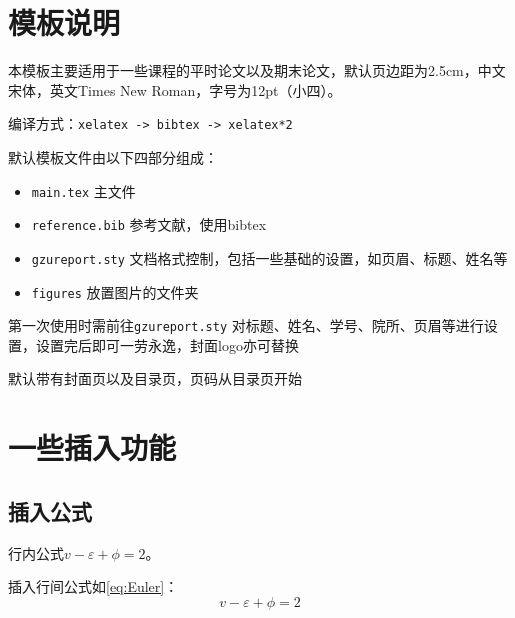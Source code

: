 \documentclass[12pt,hyperref,a4paper,UTF8]{ctexart}
\begin{document}
\cover

%
%

\thispagestyle{empty} %

\newpage
\tableofcontents

\newpage


\section{模板说明}
本模板主要适用于一些课程的平时论文以及期末论文，默认页边距为2.5cm，中文宋体，英文Times New Roman，字号为12pt（小四）。

编译方式：\verb|xelatex -> bibtex -> xelatex*2|


默认模板文件由以下四部分组成：
\begin{itemize}
    \item \texttt{main.tex} 主文件
    \item \texttt{reference.bib} 参考文献，使用bibtex
    \item \texttt{gzureport.sty} 文档格式控制，包括一些基础的设置，如页眉、标题、姓名等
    \item \texttt{figures} 放置图片的文件夹
\end{itemize}

第一次使用时需前往\texttt{gzureport.sty} 对标题、姓名、学号、院所、页眉等进行设置，设置完后即可一劳永逸，封面logo亦可替换

默认带有封面页以及目录页，页码从目录页开始

\section{一些插入功能}
\subsection{插入公式}
行内公式$v-\varepsilon+\phi=2$。

插入行间公式如\cref{eq:Euler}：
\begin{equation}
    v-\varepsilon+\phi=2
    \label{eq:Euler}
\end{equation}
\end{document}
